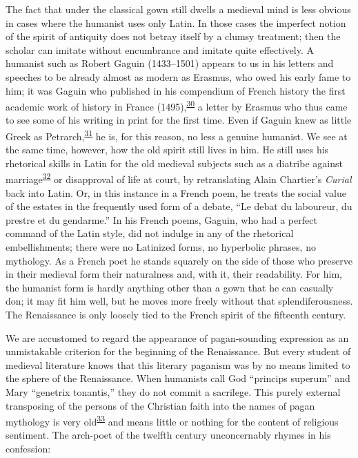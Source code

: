 The fact that under the classical gown still dwells a medieval mind is
less obvious in cases where the humanist uses only Latin. In those cases
the imperfect notion of the spirit of antiquity does not betray itself
by a clumsy treatment; then the scholar can imitate without encumbrance
and imitate quite effectively. A humanist such as Robert Gaguin
(1433--1501) appears to us in his letters and speeches to be already
almost as modern as Erasmus, who owed his early fame to him; it was
Gaguin who published in his compendium of French history the first
academic work of history in France
(1495),\textsuperscript{\protect\hypertarget{22_Chapter_Fourteen__THE_COMING_OF.xhtmlux5cux23id_64}{\protect\hyperlink{23_NOTES.xhtmlux5cux23id_65}{30}}}
a letter by Erasmus who thus came to see some of his writing in print
for the first time. Even if Gaguin knew as little Greek as
Petrarch,\textsuperscript{\protect\hypertarget{22_Chapter_Fourteen__THE_COMING_OF.xhtmlux5cux23id_62}{\protect\hyperlink{23_NOTES.xhtmlux5cux23id_63}{31}}}
he is, for this reason, no less a genuine humanist. We see at the same
time, however, how the old spirit still lives in him. He still uses his
rhetorical skills in Latin for the old medieval subjects such as a
diatribe against
marriage\textsuperscript{\protect\hypertarget{22_Chapter_Fourteen__THE_COMING_OF.xhtmlux5cux23id_60}{\protect\hyperlink{23_NOTES.xhtmlux5cux23id_61}{32}}}
or disapproval of life at court, by retranslating Alain Chartier's
\emph{Curial} back into Latin.
\protect\hypertarget{22_Chapter_Fourteen__THE_COMING_OF.xhtmlux5cux23page_393}{}{}Or,
in this instance in a French poem, he treats the social value of the
estates in the frequently used form of a debate, ``Le debat du
laboureur, du prestre et du gendarme.'' In his French poems, Gaguin, who
had a perfect command of the Latin style, did not indulge in any of the
rhetorical embellishments; there were no Latinized forms, no hyperbolic
phrases, no mythology. As a French poet he stands squarely on the side
of those who preserve in their medieval form their naturalness and, with
it, their readability. For him, the humanist form is hardly anything
other than a gown that he can casually don; it may fit him well, but he
moves more freely without that splendiferousness. The Renaissance is
only loosely tied to the French spirit of the fifteenth century.

We are accustomed to regard the appearance of pagan-sounding expression
as an unmistakable criterion for the beginning of the Renaissance. But
every student of medieval literature knows that this literary paganism
was by no means limited to the sphere of the Renaissance. When humanists
call God ``princips superum'' and Mary ``genetrix tonantis,'' they do
not commit a sacrilege. This purely external transposing of the persons
of the Christian faith into the names of pagan mythology is very
old\textsuperscript{\protect\hypertarget{22_Chapter_Fourteen__THE_COMING_OF.xhtmlux5cux23id_59}{\protect\hyperlink{23_NOTES.xhtmlux5cux23page_440}{33}}}
and means little or nothing for the content of religious sentiment. The
arch-poet of the twelfth century unconcernably rhymes in his confession:

